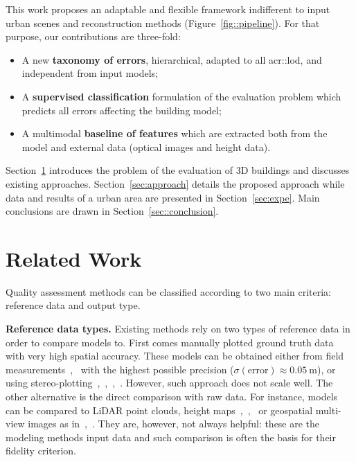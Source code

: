 \documentclass[runningheads]{llncs}
\begin{document}
     This work proposes an adaptable and flexible framework indifferent to input urban scenes and reconstruction methods (Figure~\ref{fig::pipeline}). For that purpose, our contributions are three-fold:
    \begin{itemize}
        \item A new \textbf{taxonomy of errors}, hierarchical, adapted to all \acrshort{acr::lod}, and independent from input models;
        \item A \textbf{supervised classification} formulation of the evaluation problem which predicts all errors affecting the building model;
        \item A multimodal \textbf{baseline of features} which are extracted both from the model and external data (optical images and height data).
    \end{itemize}

Section~\ref{sec:related} introduces the problem of the evaluation of 3D buildings and discusses existing approaches. Section~\ref{sec:approach} details the proposed approach while data and results of a urban area are presented in Section~\ref{sec:expe}. Main conclusions are drawn in Section~\ref{sec::conclusion}.

\section{Related Work}
\label{sec:related}
Quality assessment methods can be classified according to two main criteria: reference data and output type.

\noindent
\textbf{Reference data types.}
Existing methods rely on two types of reference data in order to compare models to. First comes manually plotted ground truth data with very high spatial accuracy. These models can be obtained either from field measurements~\cite{dick2004modelling},~\cite{Kaartinen2005} with the highest possible precision ($\sigma(\text{error}) \approx \SI{0.05}{\meter}$), or using stereo-plotting~\cite{jaynes2003recognition},~\cite{Kaartinen2005},~\cite{zebedin2008fusion},~\cite{Zeng2014}. However, such approach does not scale well. The other alternative is the direct comparison with raw data. For instance, models can be compared to LiDAR point clouds, height maps~\cite{Akca2010},~\cite{lafarge2012creating},~\cite{li2016boxfitting} or geospatial multi-view images as in~\cite{boudet2006supervised},~\cite{Michelin2013}. They are, however, not always helpful: these are the modeling methods input data and such comparison is often the basis for their fidelity criterion.
\end{document}
